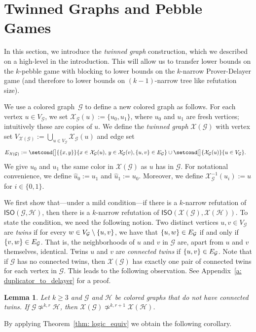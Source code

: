 \documentclass[10pt,a4paper]{article}
\newcommand{\defining}[1]{\emph{#1}}
\DeclarePairedDelimiter\set{\lbrace}{\rbrace}
\newcommand{\graphG}{\mathcal{G}}
\newcommand{\graphH}{\mathcal{H}}
\newcommand{\vertexG}{V_{\graphG}}
\newcommand{\edgeG}{E_{\graphG}}
\newcommand{\graphXG}{\mathcal{X}(\mathcal{G})}
\newcommand{\graphXH}{\mathcal{X}(\mathcal{H})}
\newcommand{\vertexXG}{V_{\graphXG}}
\newcommand{\edgeXG}{E_{\graphXG}}
\newcommand{\ISO}{\mathsf{ISO}(\graphG, \graphH)}
\newcommand{\XISO}{\mathsf{ISO}(\graphXG, \graphXH)}
\newcommand{\notkequivr}[2]{\not\simeq^{#1,#2}}
\newcommand{\X}{\mathcal{X}}
\newcommand{\XG}{\X_{\graphG}}
\newtheorem{lemma}[theorem]{Lemma}
\newcommand{\ifAppendix}[1]{#1}
\begin{document}
         
       \section{Twinned Graphs and Pebble Games} \label{sec: Clique}




In this section, we introduce the \emph{twinned graph} construction, which we described on a high-level in the introduction. This will allow us to transfer lower bounds on the $k$-pebble game with blocking to lower bounds on the $k$-narrow Prover-Delayer game (and therefore to lower bounds on $(k-1)$-narrow tree like refutation size). 

%
%
%
%
%
%
%
%
%
%
%
%
%
%
%
%
%
%
%
We use a colored graph~$\graphG$ to define a new colored graph as follows.
For each vertex $u \in \vertexG$, we set $\XG(u) := \{u_0, u_1\}$, where $u_0$ and $u_1$ are fresh vertices; intuitively these are copies of $u$. We define the \defining{twinned graph} $\graphXG$ with vertex set $\vertexXG := \bigcup_{u \in \vertexG} \XG(u)$ and edge set
\begin{align*}
  \edgeXG  &:= \setcond[\big]{ \{x,y\} }{ x \in \XG(u),\, y\in \XG(v), \{u,v\} \in \edgeG} \cup \setcond[\big]{\XG(u)}{ u\in \vertexG}.
\end{align*}  
We give $u_0$ and $u_1$ the same color in $\graphXG$ as $u$ has in $\graphG$. For notational convenience, we define $\hat{u}_0 := u_1$ and $\hat{u}_1 := u_0$. Moreover, we define $\XG^{-1}(u_i) := u$ for $i\in \{0,1\}$.

We first show that---under a mild condition---if there is a $k$-narrow refutation of $\ISO$,
then there is a $k$-narrow refutation of $\XISO$.
To state the condition, we need the following notion. Two distinct vertices $u,v \in \vertexG$ are \defining{twins} if for every $w \in \vertexG \setminus \set{u,v} $, we have that $\set{u,w} \in \edgeG$ if and only if $\set{v,w} \in \edgeG$. That is, the neighborhoods of $u$ and $v$ in $\graphG$ are, apart from $u$ and $v$ themselves, identical. Twins $u$ and $v$ are \defining{connected twins} if $\set{u,v} \in \edgeG$. Note that if $\graphG$ has no connected twins, then $\graphXG$ has exactly one pair of connected twins for each vertex in $\graphG$. This leads to the following observation. \ifAppendix{See Appendix~\ref{a: duplicator_to_delayer} for a proof.}

\begin{lemma} \label{lem: spoiler_win}
Let $k \ge 3$ and $\graphG$ and $\graphH$ be colored graphs that do not have connected twins.
If $\graphG \notkequivr{k}{r} \graphH$, then $\graphXG \notkequivr{k}{r+1} \! \graphXH$. 
\end{lemma}
%
\noindent By applying Theorem~\ref{thm: logic_equiv} we obtain the following corollary. 
\end{document}
